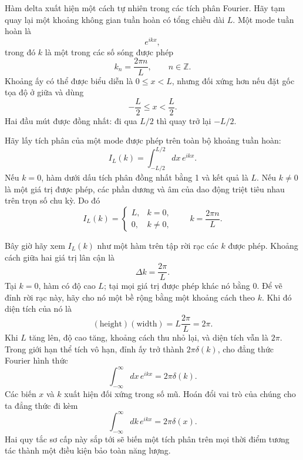 Hàm delta xuất hiện một cách tự nhiên trong các tích phân Fourier. Hãy tạm quay lại một khoảng không gian tuần hoàn có tổng chiều dài \(L\). Một mode tuần hoàn là
\begin{equation}
e^{ikx},
\end{equation}
trong đó \(k\) là một trong các số sóng được phép
\begin{equation}
k_n=\frac{2\pi n}{L},
\qquad n\in\mathbb Z.
\end{equation}
Khoảng ấy có thể được biểu diễn là \(0\leq x<L\), nhưng đối xứng hơn nếu đặt gốc tọa độ ở giữa và dùng
\begin{equation}
-\frac L2\leq x<\frac L2.
\end{equation}
Hai đầu mút được đồng nhất: đi qua \(L/2\) thì quay trở lại \(-L/2\).

Hãy lấy tích phân của một mode được phép trên toàn bộ khoảng tuần hoàn:
\begin{equation}
I_L(k)=\int_{-L/2}^{L/2}dx\,e^{ikx}.
\end{equation}
Nếu \(k=0\), hàm dưới dấu tích phân đồng nhất bằng 1 và kết quả là \(L\). Nếu \(k\neq0\) là một giá trị được phép, các phần dương và âm của dao động triệt tiêu nhau trên trọn số chu kỳ. Do đó
\begin{equation}
I_L(k)=
\begin{cases}
L,&k=0,\\[4pt]
0,&k\neq0,
\end{cases}
\qquad
k=\frac{2\pi n}{L}.
\end{equation}

Bây giờ hãy xem \(I_L(k)\) như một hàm trên tập rời rạc các \(k\) được phép. Khoảng cách giữa hai giá trị lân cận là
\begin{equation}
\Delta k=\frac{2\pi}{L}.
\end{equation}
Tại \(k=0\), hàm có độ cao \(L\); tại mọi giá trị được phép khác nó bằng 0. Để vẽ đỉnh rời rạc này, hãy cho nó một bề rộng bằng một khoảng cách theo \(k\). Khi đó diện tích của nó là
\begin{equation}
(\text{height})(\text{width})
=L\frac{2\pi}{L}=2\pi.
\end{equation}
Khi \(L\) tăng lên, độ cao tăng, khoảng cách thu nhỏ lại, và diện tích vẫn là \(2\pi\). Trong giới hạn thể tích vô hạn, đỉnh ấy trở thành \(2\pi\delta(k)\), cho đẳng thức Fourier hình thức
\begin{equation}
\int_{-\infty}^{\infty}dx\,e^{ikx}=2\pi\delta(k).
\end{equation}
Các biến \(x\) và \(k\) xuất hiện đối xứng trong số mũ. Hoán đổi vai trò của chúng cho ta đẳng thức đi kèm
\begin{equation}
\int_{-\infty}^{\infty}dk\,e^{ikx}=2\pi\delta(x).
\end{equation}
Hai quy tắc sơ cấp này sắp tới sẽ biến một tích phân trên mọi thời điểm tương tác thành một điều kiện bảo toàn năng lượng.

